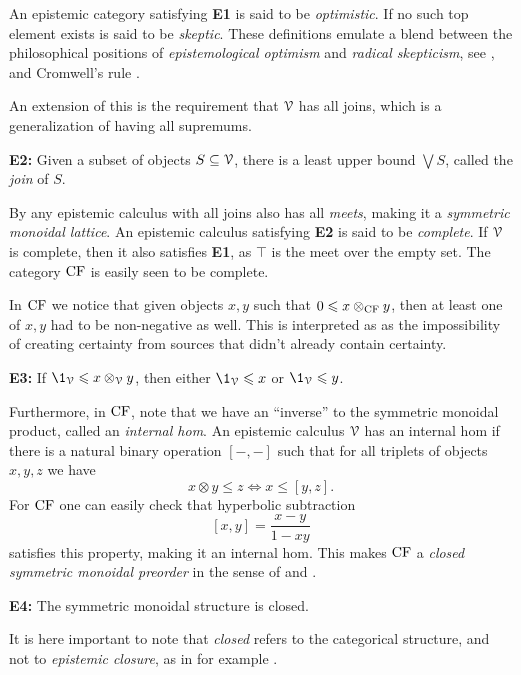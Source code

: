 An epistemic category satisfying \textbf{E1} is said to be \emph{optimistic}. If no such top element exists is said to be \emph{skeptic}. These definitions emulate a blend between the philosophical positions of \emph{epistemological optimism} and \emph{radical skepticism}, see \cite{haskins_2004, neto_1997}, and Cromwell's rule \cite{lindley_1991}. 

An extension of this is the requirement that $\EuScript{V}$ has all joins, which is a generalization of having all supremums. 

\textbf{E2:} Given a subset of objects $S\subseteq \EuScript{V}$, there is a least upper bound $\bigvee S$, called the \emph{join} of $S$. 

By \cite[2.72]{fong-spivak_2019} any epistemic calculus with all joins also has all \emph{meets}, making it a \emph{symmetric monoidal lattice}. An epistemic calculus satisfying \textbf{E2} is said to be \emph{complete}. If $\EuScript{V}$ is complete, then it also satisfies \textbf{E1}, as $\top$ is the meet over the empty set. The category $\mathrm{CF}$ is easily seen to be complete. 

In $\mathrm{CF}$ we notice that given objects $x,y$ such that $0 \leqslant x\otimes_{\mathrm{CF}} y$, then at least one of $x,y$ had to be non-negative as well. This is interpreted as as the impossibility of creating certainty from sources that didn't already contain certainty.

\textbf{E3:} If $\1_\V \leq x\otimes_\V y$, then either $\1_\V \leq x$ or $\1_\V \leq y$.

Furthermore, in $\mathrm{CF}$, note that we have an ``inverse'' to the symmetric monoidal product, called an \emph{internal hom}. An epistemic calculus $\EuScript{V}$ has an internal hom if there is a natural binary operation $[-,-]$ such that for all triplets of objects $x,y,z$ we have 
\[x\otimes y \leq z \iff x\leq [y,z].\]
For $\mathrm{CF}$ one can easily check that hyperbolic subtraction
\[[x,y] = \frac{x-y}{1-xy}\]
satisfies this property, making it an internal hom. This makes $\mathrm{CF}$ a \emph{closed symmetric monoidal preorder} in the sense of \cite{bradley-terilla-vlassopoulos_2022} and \cite{fong-spivak_2019}. 

\textbf{E4:} The symmetric monoidal structure is closed. 

\begin{remark}
    It is here important to note that \emph{closed} refers to the categorical structure, and not to \emph{epistemic closure}, as in for example \cite{holliday_2015}. 
\end{remark}

